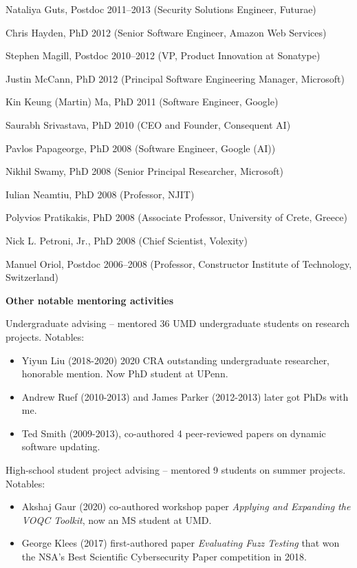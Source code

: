 \documentclass[11pt]{article}
\begin{document}
\begin{description}
\item Nataliya Guts, Postdoc 2011--2013 (Security Solutions Engineer, Futurae)
\item Chris Hayden, PhD 2012 (Senior Software Engineer, Amazon Web Services)
\item Stephen Magill, Postdoc 2010--2012 (VP, Product Innovation at Sonatype)
\item Justin McCann, PhD 2012 (Principal Software Engineering Manager, Microsoft)
\item Kin Keung (Martin) Ma, PhD 2011 (Software Engineer, Google)
\item Saurabh Srivastava, PhD 2010 (CEO and Founder, Consequent AI)
\item Pavlos Papageorge, PhD 2008 (Software Engineer, Google (AI))
\item Nikhil Swamy, PhD 2008 (Senior Principal Researcher, Microsoft)
\item Iulian Neamtiu, PhD 2008 (Professor, NJIT)
\item Polyvios Pratikakis, PhD 2008 (Associate Professor, University of Crete, Greece)
\item Nick L. Petroni, Jr., PhD 2008 (Chief Scientist, Volexity)
\item Manuel Oriol, Postdoc 2006--2008 (Professor, Constructor Institute of Technology, Switzerland)
\end{description}

\begin{description}
\setlength{\labelsep}{0ex}
\setlength{\itemsep}{-0.5ex}

\item {\bf\textsf Other notable mentoring activities}

\item Undergraduate advising -- mentored 36 UMD undergraduate students
  on research projects. Notables:
  \begin{itemize}
    \item Yiyun Liu (2018-2020) 2020 CRA outstanding
      undergraduate researcher, honorable mention. Now PhD student at
      UPenn.
    \item Andrew Ruef (2010-2013) and James Parker (2012-2013)
      later got PhDs with me.
    \item Ted Smith (2009-2013), co-authored 4 peer-reviewed papers on
      dynamic software updating.
      \end{itemize}
\item High-school student project advising -- mentored 9 students on
  summer projects. Notables:
  \begin{itemize}
  \item Akshaj Gaur (2020) co-authored workshop paper \emph{Applying
      and Expanding the VOQC Toolkit}, now an MS student at UMD.
    \item George Klees (2017) first-authored paper \emph{Evaluating
        Fuzz Testing} that won the NSA's Best Scientific Cybersecurity
      Paper competition in 2018.
    \end{itemize}

  \end{description}
\end{document}
